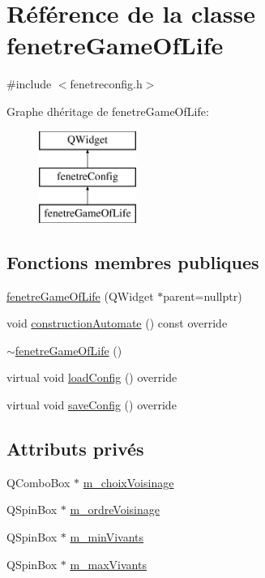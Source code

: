 \hypertarget{classfenetre_game_of_life}{}\section{Référence de la classe fenetre\+Game\+Of\+Life}
\label{classfenetre_game_of_life}


{\ttfamily \#include $<$fenetreconfig.\+h$>$}

Graphe d\textquotesingle{}héritage de fenetre\+Game\+Of\+Life\+:\begin{figure}[H]
\begin{center}
\leavevmode
\includegraphics[height=3.000000cm]{classfenetre_game_of_life}
\end{center}
\end{figure}
\subsection*{Fonctions membres publiques}
\begin{DoxyCompactItemize}
\item 
\mbox{\hyperlink{classfenetre_game_of_life_a11bd76b5574d5bb2e0f1bb8114fab99f}{fenetre\+Game\+Of\+Life}} (Q\+Widget $\ast$parent=nullptr)
\item 
void \mbox{\hyperlink{classfenetre_game_of_life_a76bc46f313a3d3b39ab060702de0b614}{construction\+Automate}} () const override
\item 
\mbox{\hyperlink{classfenetre_game_of_life_a1cd09ff95e56f1b66b8a7a7f71fb44f2}{$\sim$fenetre\+Game\+Of\+Life}} ()
\item 
virtual void \mbox{\hyperlink{classfenetre_game_of_life_a336a5b5e63dcddc116cc7bfc96d21dd8}{load\+Config}} () override
\item 
virtual void \mbox{\hyperlink{classfenetre_game_of_life_aaa79df41aba182775dab13d42656220a}{save\+Config}} () override
\end{DoxyCompactItemize}
\subsection*{Attributs privés}
\begin{DoxyCompactItemize}
\item 
Q\+Combo\+Box $\ast$ \mbox{\hyperlink{classfenetre_game_of_life_a551b8c697797121124666e4917fa2df9}{m\+\_\+choix\+Voisinage}}
\item 
Q\+Spin\+Box $\ast$ \mbox{\hyperlink{classfenetre_game_of_life_a7267e755bb11b6949a049df4198f6a11}{m\+\_\+ordre\+Voisinage}}
\item 
Q\+Spin\+Box $\ast$ \mbox{\hyperlink{classfenetre_game_of_life_a54ed3c46d8409c0ec0f23a7b4aed11b0}{m\+\_\+min\+Vivants}}
\item 
Q\+Spin\+Box $\ast$ \mbox{\hyperlink{classfenetre_game_of_life_adfa79f81d5d2731529e046b338f4a481}{m\+\_\+max\+Vivants}}
\end{DoxyCompactItemize}
